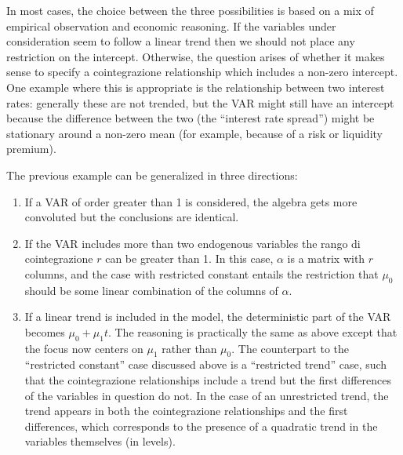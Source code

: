 In most cases, the choice between the three possibilities is based on
a mix of empirical observation and economic reasoning. If the
variables under consideration seem to follow a linear trend then we
should not place any restriction on the intercept. Otherwise, the
question arises of whether it makes sense to specify a cointegrazione
relationship which includes a non-zero intercept. One example where
this is appropriate is the relationship between two interest rates:
generally these are not trended, but the VAR might still have an
intercept because the difference between the two (the ``interest rate
spread'') might be stationary around a non-zero mean (for example,
because of a risk or liquidity premium).
    
The previous example can be generalized in three directions:
    
\begin{enumerate}
\item If a VAR of order greater than 1 is considered, the algebra gets
  more convoluted but the conclusions are identical.
\item If the VAR includes more than two endogenous variables the
  rango di cointegrazione $r$ can be greater than 1. In this case, $\alpha$
  is a matrix with $r$ columns, and the case with restricted constant
  entails the restriction that $\mu_0$ should be some linear
  combination of the columns of $\alpha$.
\item If a linear trend is included in the model, the deterministic
  part of the VAR becomes $\mu_0 + \mu_1 t$. The reasoning is
  practically the same as above except that the focus now centers on
  $\mu_1$ rather than $\mu_0$.  The counterpart to the ``restricted
  constant'' case discussed above is a ``restricted trend'' case, such
  that the cointegrazione relationships include a trend but the first
  differences of the variables in question do not.  In the case of an
  unrestricted trend, the trend appears in both the cointegrazione
  relationships and the first differences, which corresponds to the
  presence of a quadratic trend in the variables themselves (in
  levels).
\end{enumerate}

